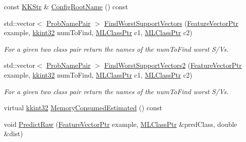 \begin{DoxyCompactItemize}
\item 
const \hyperlink{class_k_k_b_1_1_k_k_str}{K\+K\+Str} \& \hyperlink{class_k_k_m_l_l_1_1_classifier2_ad8faec2055155639e44947409c962e0b}{Config\+Root\+Name} () const 
\item 
std\+::vector$<$ \hyperlink{class_k_k_m_l_l_1_1_prob_name_pair}{Prob\+Name\+Pair} $>$ \hyperlink{class_k_k_m_l_l_1_1_classifier2_a69ec0cceb74d0d637e238db7a0f8c021}{Find\+Worst\+Support\+Vectors} (\hyperlink{namespace_k_k_m_l_l_a0c5df3d48f45926fbc4fee04f5e3bc04}{Feature\+Vector\+Ptr} example, \hyperlink{namespace_k_k_b_a8fa4952cc84fda1de4bec1fbdd8d5b1b}{kkint32} num\+To\+Find, \hyperlink{namespace_k_k_m_l_l_ac272393853d59e72e8456f14cd6d8c23}{M\+L\+Class\+Ptr} c1, \hyperlink{namespace_k_k_m_l_l_ac272393853d59e72e8456f14cd6d8c23}{M\+L\+Class\+Ptr} c2)
\begin{DoxyCompactList}\small\item\em For a given two class pair return the names of the \textquotesingle{}num\+To\+Find\textquotesingle{} worst S/V\textquotesingle{}s. \end{DoxyCompactList}\item 
std\+::vector$<$ \hyperlink{class_k_k_m_l_l_1_1_prob_name_pair}{Prob\+Name\+Pair} $>$ \hyperlink{class_k_k_m_l_l_1_1_classifier2_a0e826d13e90cec34d0b2e6f7611ab93c}{Find\+Worst\+Support\+Vectors2} (\hyperlink{namespace_k_k_m_l_l_a0c5df3d48f45926fbc4fee04f5e3bc04}{Feature\+Vector\+Ptr} example, \hyperlink{namespace_k_k_b_a8fa4952cc84fda1de4bec1fbdd8d5b1b}{kkint32} num\+To\+Find, \hyperlink{namespace_k_k_m_l_l_ac272393853d59e72e8456f14cd6d8c23}{M\+L\+Class\+Ptr} c1, \hyperlink{namespace_k_k_m_l_l_ac272393853d59e72e8456f14cd6d8c23}{M\+L\+Class\+Ptr} c2)
\begin{DoxyCompactList}\small\item\em For a given two class pair return the names of the \textquotesingle{}num\+To\+Find\textquotesingle{} worst S/V\textquotesingle{}s. \end{DoxyCompactList}\item 
virtual \hyperlink{namespace_k_k_b_a8fa4952cc84fda1de4bec1fbdd8d5b1b}{kkint32} \hyperlink{class_k_k_m_l_l_1_1_classifier2_a7fdaaa64365e285455f1cb5639bbaacd}{Memory\+Consumed\+Estimated} () const 
\item 
void \hyperlink{class_k_k_m_l_l_1_1_classifier2_acb226d7798d79bfce1b18d16577d212c}{Predict\+Raw} (\hyperlink{namespace_k_k_m_l_l_a0c5df3d48f45926fbc4fee04f5e3bc04}{Feature\+Vector\+Ptr} example, \hyperlink{namespace_k_k_m_l_l_ac272393853d59e72e8456f14cd6d8c23}{M\+L\+Class\+Ptr} \&pred\+Class, double \&dist)

\end{DoxyCompactItemize}

